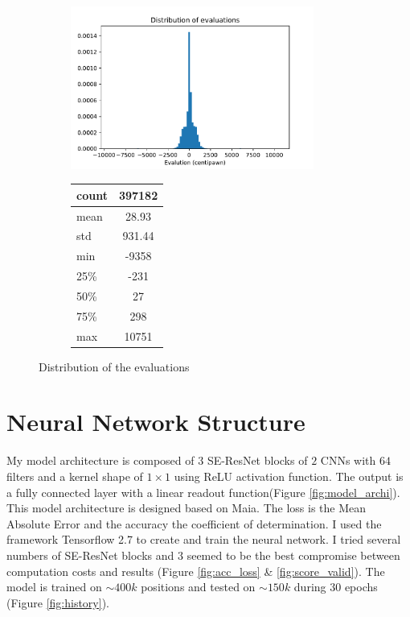 \documentclass[a4paper]{article}
\begin{document}
\begin{figure}[H]
  \centering
  \begin{subfigure}{.5\textwidth}
    \centering
    \includegraphics[width=8cm]{distribution.pdf}
  \end{subfigure}%
  \begin{subfigure}{.5\textwidth}
    \centering
    \begin{tabular}{ | l | c | }
      \hline
      count & 397182 \\ \hline
      mean  & 28.93 \\ \hline
      std   &  931.44\\ \hline
      min   & -9358\\ \hline
      25\%  & -231\\ \hline
      50\%  & 27\\ \hline
      75\%  & 298\\ \hline
      max   & 10751\\ \hline
    \end{tabular}
  \end{subfigure}
  \caption{Distribution of the evaluations}
  \label{fig:distribution}
  \end{figure}

\section{Neural Network Structure}
My model architecture is composed of $3$ SE-ResNet blocks of $2$ CNNs with $64$ filters
and a kernel shape of $1\times1$ using ReLU activation function. The output is a
fully connected layer with a linear readout function(Figure \ref{fig:model_archi}).
This model architecture is designed based on Maia\cite{maia}.
The loss is the Mean Absolute Error and the accuracy the coefficient of determination.
I used the framework Tensorflow 2.7 to create and train the neural network.
I tried several numbers of SE-ResNet blocks and $3$ seemed
to be the best compromise between computation costs and results
(Figure \ref{fig:acc_loss} \& \ref{fig:score_valid}).
The model is trained on $\sim 400k$ positions and tested on $\sim 150k$ during 30 epochs (Figure \ref{fig:history}).
\end{document}
